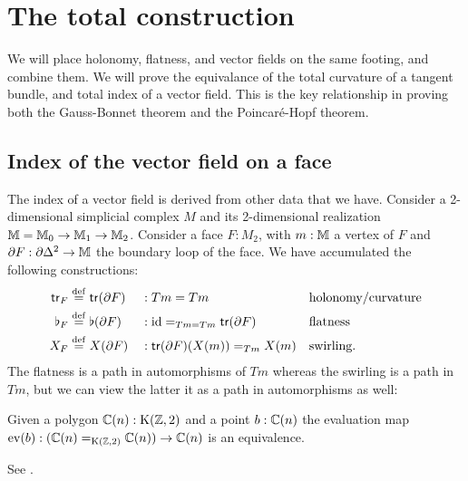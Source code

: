 \section{The total construction}
\label{sec:totals}
We will place holonomy, flatness, and vector fields on the same footing, and combine them. We will prove the equivalance of the total curvature of a tangent bundle, and total index of a vector field. This is the key relationship in proving both the Gauss-Bonnet theorem and the Poincaré-Hopf theorem.

\subsection{Index of the vector field on a face}
The index of a vector field is derived from other data that we have. Consider a 2-dimensional simplicial complex \( M \) and its 2-dimensional realization \( \mathbb{M}=\mathbb{M}_0\to\mathbb{M}_1\to\mathbb{M}_2 \). Consider a face \( F:M_2 \), with \( m:\mathbb{M} \) a vertex of \( F \) and \( \partial F:\partial\Delta^2\to\mathbb{M} \) the boundary loop of the face. We have accumulated the following constructions:
\[\begin{aligned}
\mathsf{tr}_F&\stackrel{\mathrm{def}}{=} \mathsf{tr}(\partial F)&&:Tm=Tm&&\text{holonomy/curvature}\\
\flat_F&\stackrel{\mathrm{def}}{=} \flat(\partial F)&&:\text{id}=_{Tm=Tm}\mathsf{tr}(\partial F)&&\text{flatness}\\
X_F&\stackrel{\mathrm{def}}{=} X(\partial F)&&:\mathsf{tr}(\partial F)(X(m))=_{Tm}X(m)&&\text{swirling.}\\
\end{aligned}\]
The flatness is a path in automorphisms of \( Tm \) whereas the swirling is a path in \( Tm \), but we can view the latter it as a path in automorphisms as well:
\begin{myprop}
\label{prop:eveq}
Given a polygon \( \mathbb{C}(n):\mathrm{K}(\mathbb{Z},2) \) and a point \( b:\mathbb{C}(n) \) the evaluation map \( \mathrm{ev}(b):(\mathbb{C}(n)=_{\mathrm{K}(\mathbb{Z},2)}\mathbb{C}(n))\to \mathbb{C}(n) \) is an equivalence.
\end{myprop}
\begin{myproof}
See \cite{buchholtz2023central}.
\end{myproof}


